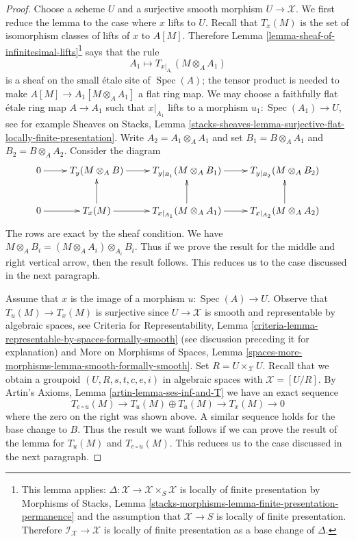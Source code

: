 \documentclass[10pt,a4paper]{amsart}
\theoremstyle{plain}
\theoremstyle{definition}
\theoremstyle{remark}
\numberwithin{equation}{subsection}
\def\Spec{\mathop{\mathrm{Spec}}}
\begin{document}
\begin{proof}
Choose a scheme $U$ and a surjective smooth morphism $U \to \mathcal{X}$.
We first reduce the lemma to the case where $x$ lifts to $U$.
Recall that $T_x(M)$ is the set of isomorphism classes of lifts of $x$
to $A[M]$. Therefore
Lemma \ref{lemma-sheaf-of-infinitesimal-lifts}\footnote{This lemma applies:
$\Delta : \mathcal{X} \to \mathcal{X} \times_S \mathcal{X}$
is locally of finite presentation by
Morphisms of Stacks, Lemma
\ref{stacks-morphisms-lemma-finite-presentation-permanence}
and the assumption that $\mathcal{X} \to S$ is locally of finite presentation.
Therefore $\mathcal{I}_\mathcal{X} \to \mathcal{X}$ is locally
of finite presentation as a base change of $\Delta$.}
says that the rule
$$
A_1 \mapsto T_{x|_{A_1}}(M \otimes_A A_1)
$$
is a sheaf on the small \'etale site of $\Spec(A)$; the tensor product
is needed to make $A[M] \to A_1[M \otimes_A A_1]$ a flat ring map.
We may choose a faithfully flat \'etale ring map $A \to A_1$
such that $x|_{A_1}$ lifts to a morphism $u_1 : \Spec(A_1) \to U$, see
for example Sheaves on Stacks, Lemma
\ref{stacks-sheaves-lemma-surjective-flat-locally-finite-presentation}.
Write $A_2 = A_1 \otimes_A A_1$ and set $B_1 = B \otimes_A A_1$
and $B_2 = B \otimes_A A_2$. Consider the diagram
$$
\xymatrix{
0 \ar[r] &
T_y(M \otimes_A B) \ar[r] &
T_{y|_{B_1}}(M \otimes_A B_1) \ar[r] &
T_{y|_{B_2}}(M \otimes_A B_2) \\
0 \ar[r] &
T_x(M) \ar[r] \ar[u] &
T_{x|_{A_1}}(M \otimes_A A_1) \ar[r] \ar[u] &
T_{x|_{A_2}}(M \otimes_A A_2) \ar[u]
}
$$
The rows are exact by the sheaf condition. We have
$M \otimes_A B_i = (M \otimes_A A_i) \otimes_{A_i} B_i$.
Thus if we prove the result for the middle and right vertical arrow, then
the result follows. This reduces us to the case discussed in
the next paragraph.

\medskip\noindent
Assume that $x$ is the image of a morphism $u : \Spec(A) \to U$.
Observe that $T_u(M) \to T_x(M)$ is surjective since
$U \to \mathcal{X}$ is smooth and representable by
algebraic spaces, see Criteria for Representability, Lemma
\ref{criteria-lemma-representable-by-spaces-formally-smooth}
(see discussion preceding it for explanation) and
More on Morphisms of Spaces, Lemma
\ref{spaces-more-morphisms-lemma-smooth-formally-smooth}.
Set $R = U \times_\mathcal{X} U$. Recall that we obtain
a groupoid $(U, R, s, t, c, e, i)$ in algebraic spaces with
$\mathcal{X} = [U/R]$. By
Artin's Axioms, Lemma \ref{artin-lemma-ses-inf-and-T}
we have an exact sequence
$$
T_{e \circ u}(M) \to T_u(M) \oplus T_u(M) \to T_x(M) \to 0
$$
where the zero on the right was shown above. A similar sequence
holds for the base change to $B$. Thus the result we want follows if
we can prove the result of the lemma for
$T_u(M)$ and $T_{e \circ u}(M)$. This reduces us to the case discussed
in the next paragraph.


\end{proof}
\end{document}
